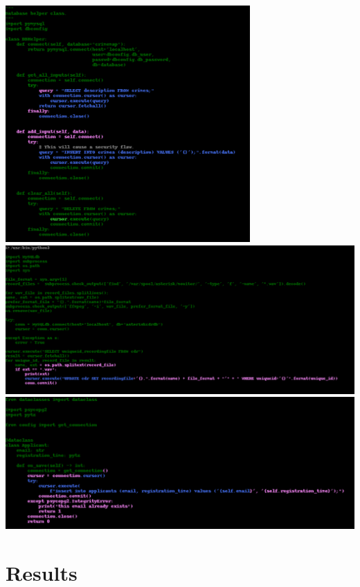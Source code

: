 \documentclass[
	a4paper,
	pagesize,
	pdftex,
	12pt,
	twoside, %
	BCOR=5mm, %
	ngerman,
	fleqn,
	final,
	]{scrartcl}
\begin{document}
\includegraphics[width=0.7\textwidth]{img/Example1}\\
\includegraphics[width=1\textwidth]{img/Example2}\\
\includegraphics[width=1\textwidth]{img/Example3}



\newpage

\section{Results}
\end{document}
